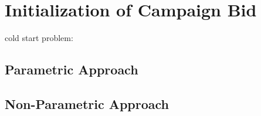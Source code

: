 \documentclass[../main.tex]{subfiles}
\begin{document}
	\chapter{Initialization of Campaign Bid}
	 \label{init}
	

	cold start problem: \cite{lattimore2020bandit} \cite{russo2018tutorial}
	
	
	\section{Parametric Approach}
	
	\section{Non-Parametric Approach}
	
	
\end{document}

